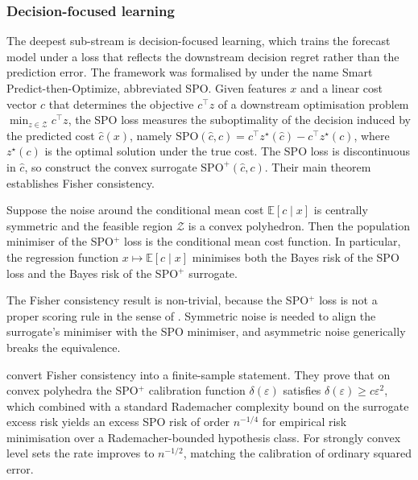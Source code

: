 \subsubsection{Decision-focused learning}
\label{sec:dfl}

The deepest sub-stream is decision-focused learning, which trains the forecast
model under a loss that reflects the downstream decision regret rather than the
prediction error. The framework was formalised by \citet{ElmachtoubGrigas2022} under
the name Smart Predict-then-Optimize, abbreviated SPO. Given features $x$ and a
linear cost vector $c$ that determines the objective $c^\top z$ of a downstream
optimisation problem $\min_{z \in \mathcal Z} c^\top z$, the SPO loss measures the
suboptimality of the decision induced by the predicted cost $\hat c(x)$, namely
$\mathrm{SPO}(\hat c, c) = c^\top z^\star(\hat c) - c^\top z^\star(c)$, where
$z^\star(c)$ is the optimal solution under the true cost. The SPO loss is
discontinuous in $\hat c$, so \citet{ElmachtoubGrigas2022} construct the convex
surrogate $\mathrm{SPO}^+(\hat c, c)$. Their main theorem establishes Fisher
consistency.

\begin{theorem}
\label{thm:spo_fisher}
Suppose the noise around the conditional mean cost $\mathbb E[c \mid x]$ is centrally
symmetric and the feasible region $\mathcal Z$ is a convex polyhedron. Then the
population minimiser of the SPO$^+$ loss is the conditional mean cost function. In
particular, the regression function $x \mapsto \mathbb E[c \mid x]$ minimises both
the Bayes risk of the SPO loss and the Bayes risk of the SPO$^+$ surrogate.
\end{theorem}

The Fisher consistency result is non-trivial, because the SPO$^+$ loss is not a
proper scoring rule in the sense of \citet{GneitingRaftery2007}. Symmetric noise is
needed to align the surrogate's minimiser with the SPO minimiser, and asymmetric
noise generically breaks the equivalence.

\citet{LiuGrigas2021} convert Fisher consistency into a finite-sample statement. They
prove that on convex polyhedra the SPO$^+$ calibration function $\delta(\varepsilon)$
satisfies $\delta(\varepsilon) \ge c \varepsilon^2$, which combined with a standard
Rademacher complexity bound on the surrogate excess risk yields an excess SPO risk
of order $n^{-1/4}$ for empirical risk minimisation over a Rademacher-bounded
hypothesis class. For strongly convex level sets the rate improves to $n^{-1/2}$,
matching the calibration of ordinary squared error.

